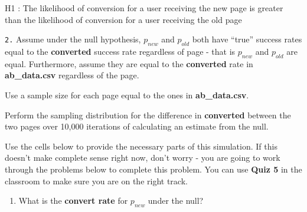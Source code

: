 \documentclass[11pt]{article}
\providecommand{\tightlist}{%
      \setlength{\itemsep}{0pt}\setlength{\parskip}{0pt}}
\begin{document}
H1 : The likelihood of conversion for a user receiving the new page is
greater than the likelihood of conversion for a user receiving the old
page

    \texttt{2.} Assume under the null hypothesis, \(p_{new}\) and
\(p_{old}\) both have ``true'' success rates equal to the
\textbf{converted} success rate regardless of page - that is \(p_{new}\)
and \(p_{old}\) are equal. Furthermore, assume they are equal to the
\textbf{converted} rate in \textbf{ab\_data.csv} regardless of the page.

Use a sample size for each page equal to the ones in
\textbf{ab\_data.csv}.

Perform the sampling distribution for the difference in
\textbf{converted} between the two pages over 10,000 iterations of
calculating an estimate from the null.

Use the cells below to provide the necessary parts of this simulation.
If this doesn't make complete sense right now, don't worry - you are
going to work through the problems below to complete this problem. You
can use \textbf{Quiz 5} in the classroom to make sure you are on the
right track.

    \begin{enumerate}
\def\labelenumi{\alph{enumi}.}
\tightlist
\item
  What is the \textbf{convert rate} for \(p_{new}\) under the null?
\end{enumerate}
\end{document}
